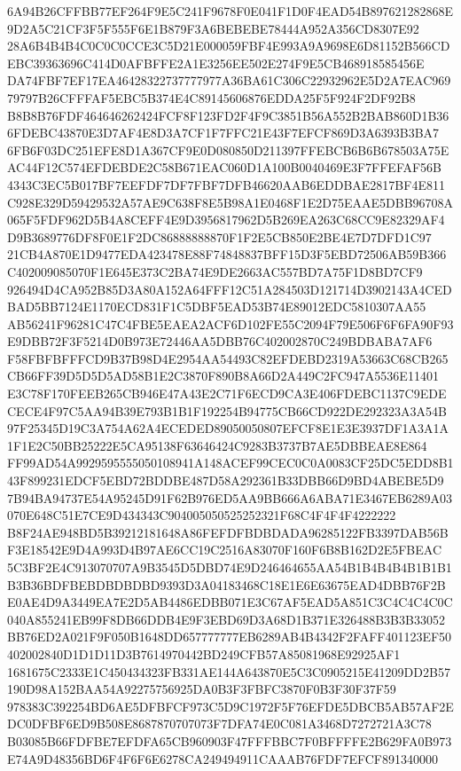 \documentclass[UTF8,fontset=fandol,zihao=-4,a4paper]{ctexart}
\begin{document}
{{6A94B26CFFBB77EF264F9E5C241F9678F0E041F1D0F4EAD54B897621282868E9D2A5C21CF3F5F555F6E1B879F3A6BEBEBE78444A952A356CD8307E92
28A6B4B4B4C0C0C0CCE3C5D21E000059FBF4E993A9A9698E6D81152B566CDEBC39363696C414D0AFBFFE2A1E3256EE502E274F9E5CB468918585456E
DA74FBF7EF17EA46428322737777977A36BA61C306C22932962E5D2A7EAC96979797B26CFFFAF5EBC5B374E4C89145606876EDDA25F5F924F2DF92B8
B8B8B76FDF464646262424FCF8F123FD2F4F9C3851B56A552B2BAB860D1B366FDEBC43870E3D7AF4E8D3A7CF1F7FFC21E43F7EFCF869D3A6393B3BA7
6FB6F03DC251EFE8D1A367CF9E0D080850D211397FFEBCB6B6B678503A75EAC44F12C574EFDEBDE2C58B671EAC060D1A100B0040469E3F7FFEFAF56B
4343C3EC5B017BF7EEFDF7DF7FBF7DFB46620AAB6EDDBAE2817BF4E811C928E329D59429532A57AE9C638F8E5B98A1E0468F1E2D75EAAE5DBB96708A
065F5FDF962D5B4A8CEFF4E9D3956817962D5B269EA263C68CC9E82329AF4D9B3689776DF8F0E1F2DC86888888870F1F2E5CB850E2BE4E7D7DFD1C97
21CB4A870E1D9477EDA423478E88F74848837BFF15D3F5EBD72506AB59B366C402009085070F1E645E373C2BA74E9DE2663AC557BD7A75F1D8BD7CF9
926494D4CA952B85D3A80A152A64FFF12C51A284503D121714D3902143A4CEDBAD5BB7124E1170ECD831F1C5DBF5EAD53B74E89012EDC5810307AA55
AB56241F96281C47C4FBE5EAEA2ACF6D102FE55C2094F79E506F6F6FA90F93E9DBB72F3F5214D0B973E72446AA5DBB76C402002870C249BDBABA7AF6
F58FBFBFFFCD9B37B98D4E2954AA54493C82EFDEBD2319A53663C68CB265CB66FF39D5D5D5AD58B1E2C3870F890B8A66D2A449C2FC947A5536E11401
E3C78F170FEEB265CB946E47A43E2C71F6ECD9CA3E406FDEBC1137C9EDECECE4F97C5AA94B39E793B1B1F192254B94775CB66CD922DE292323A3A54B
97F25345D19C3A754A62A4ECEDED89050050807EFCF8E1E3E3937DF1A3A1A1F1E2C50BB25222E5CA95138F63646424C9283B3737B7AE5DBBEAE8E864
FF99AD54A9929595555050108941A148ACEF99CEC0C0A0083CF25DC5EDD8B143F899231EDCF5EBD72BDDBE487D58A292361B33DBB66D9BD4ABEBE5D9
7B94BA94737E54A95245D91F62B976ED5AA9BB666A6ABA71E3467EB6289A03070E648C51E7CE9D434343C904005050525252321F68C4F4F4F4222222
B8F24AE948BD5B39212181648A86FEFDFBDBDADA96285122FB3397DAB56BF3E18542E9D4A993D4B97AE6CC19C2516A83070F160F6B8B162D2E5FBEAC
5C3BF2E4C913070707A9B3545D5DBD74E9D246464655AA54B1B4B4B4B1B1B1B3B36BDFBEBDBDBDBD9393D3A04183468C18E1E6E63675EAD4DBB76F2B
E0AE4D9A3449EA7E2D5AB4486EDBB071E3C67AF5EAD5A851C3C4C4C4C0C040A855241EB99F8DB66DDB4E9F3EBD69D3A68D1B371E326488B3B3B33052
BB76ED2A021F9F050B1648DD657777777EB6289AB4B4342F2FAFF401123EF50402002840D1D1D11D3B7614970442BD249CFB57A85081968E92925AF1
1681675C2333E1C450434323FB331AE144A643870E5C3C0905215E41209DD2B57190D98A152BAA54A92275756925DA0B3F3FBFC3870F0B3F30F37F59
978383C392254BD6AE5DFBFCF973C5D9C1972F5F76EFDE5DBCB5AB57AF2EDC0DFBF6ED9B508E8687870707073F7DFA74E0C081A3468D7272721A3C78
B03085B66FDFBE7EFDFA65CB960903F47FFFBBC7F0BFFFFE2B629FA0B973E74A9D48356BD6F4F6F6E6278CA249494911CAAAB76FDF7EFCF891340000
}}
\end{document}
